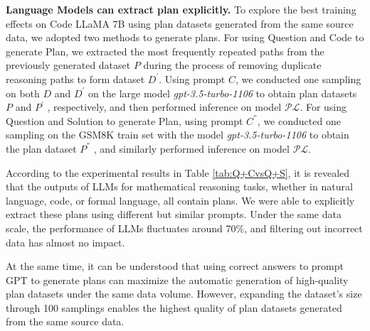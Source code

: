 \documentclass[11pt]{article}
\begin{document}

\textbf{Language Models can extract plan explicitly.} To explore the best training effects on Code LLaMA 7B using plan datasets generated from the same source data, we adopted two methods to generate plans. For using Question and Code to generate Plan, we extracted the most frequently repeated paths from the previously generated dataset $P$ during the process of removing duplicate reasoning paths to form dataset $D^{'}$. Using prompt $C$, we conducted one sampling on both $D$ and $D^{'}$ on the large model \textit{gpt-3.5-turbo-1106} to obtain plan datasets $P$ and $P^{'}$ , respectively, and then performed inference on model $\mathcal{PL}$. For using Question and Solution to generate Plan, using prompt $C^{''}$, we conducted one sampling on the GSM8K train set with the model \textit{gpt-3.5-turbo-1106} to obtain the plan dataset $P^{''}$ , and similarly performed inference on model $\mathcal{PL}$. 


According to the experimental results in Table \ref{tab:Q+CvsQ+S}, it is revealed that the outputs of LLMs for mathematical reasoning tasks, whether in natural language, code, or formal language, all contain plans. We were able to explicitly extract these plans using different but similar prompts. Under the same data scale, the performance of LLMs fluctuates around 70\%, and filtering out incorrect data has almost no impact.


At the same time, it can be understood that using correct answers to prompt GPT to generate plans can maximize the automatic generation of high-quality plan datasets under the same data volume. However, expanding the dataset's size through 100 samplings enables the highest quality of plan datasets generated from the same source data.
\end{document}
